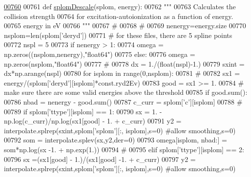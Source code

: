 \begin{DoxyCode}
\hypertarget{namespacepyneb_1_1utils_1_1__chianti__tools_l00760}{}\hyperlink{namespacepyneb_1_1utils_1_1__chianti__tools_a2cd45e7b512b31d25e92f3adf69b1914}{00760} 
00761 \textcolor{keyword}{def }\hyperlink{namespacepyneb_1_1utils_1_1__chianti__tools_a2cd45e7b512b31d25e92f3adf69b1914}{splomDescale}(splom, energy):
00762     \textcolor{stringliteral}{"""}
00763 \textcolor{stringliteral}{    Calculates the collision strength}
00764 \textcolor{stringliteral}{    for excitation-autoionization as a function of energy.}
00765 \textcolor{stringliteral}{    energy in eV}
00766 \textcolor{stringliteral}{    """}
00767     \textcolor{comment}{#}
00768     \textcolor{comment}{#}
00769     nenergy=energy.size
00770     nsplom=len(splom[\textcolor{stringliteral}{'deryd'}])
00771     \textcolor{comment}{# for these files, there are 5 spline points}
00772     nspl = 5
00773     \textcolor{keywordflow}{if} nenergy > 1:
00774         omega = np.zeros((nsplom,nenergy),\textcolor{stringliteral}{"float64"})
00775     \textcolor{keywordflow}{else}:
00776         omega = np.zeros(nsplom,\textcolor{stringliteral}{"float64"})
00777     \textcolor{comment}{#}
00778     dx = 1./(float(nspl)-1.)
00779     sxint = dx*np.arange(nspl)
00780     \textcolor{keywordflow}{for} isplom \textcolor{keywordflow}{in} range(0,nsplom):
00781         \textcolor{comment}{#}
00782         sx1 = energy/(splom[\textcolor{stringliteral}{'deryd'}][isplom]*const.ryd2Ev)
00783         good = sx1 >= 1.
00784         \textcolor{comment}{# make sure there are some valid energies above the threshold}
00785         \textcolor{keywordflow}{if} good.sum():
00786             nbad = nenergy - good.sum()
00787             c\_curr = splom[\textcolor{stringliteral}{'c'}][isplom]
00788             \textcolor{comment}{#}
00789             \textcolor{keywordflow}{if} splom[\textcolor{stringliteral}{'ttype'}][isplom] == 1:
00790                 sx = 1. - np.log(c\_curr)/np.log(sx1[good] - 1. + c\_curr)
00791                 y2 = interpolate.splrep(sxint,splom[\textcolor{stringliteral}{'splom'}][:, isplom],s=0)  \textcolor{comment}{#allow smoothing,s=0)}
00792                 som = interpolate.splev(sx,y2,der=0)
00793                 omega[isplom, nbad:] = som*np.log(sx -1. + np.exp(1.))
00794             \textcolor{comment}{#}
00795             \textcolor{keywordflow}{elif} splom[\textcolor{stringliteral}{'ttype'}][isplom] == 2:
00796                 sx =(sx1[good] - 1.)/(sx1[good] -1. + c\_curr)
00797                 y2 = interpolate.splrep(sxint,splom[\textcolor{stringliteral}{'splom'}][:, isplom],s=0)  \textcolor{comment}{#allow smoothing,s=0)}

\end{DoxyCode}
